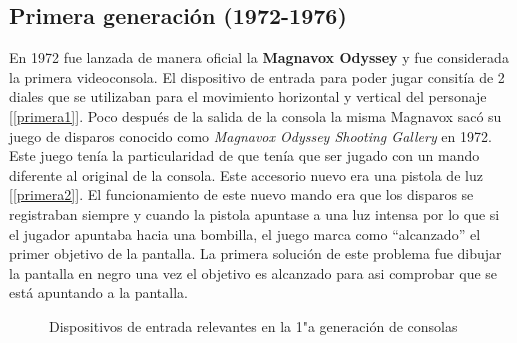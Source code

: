 \subsection{Primera generaci\'on (1972-1976)}

En 1972 fue lanzada de manera oficial la \textbf{Magnavox Odyssey} y fue considerada la primera videoconsola. El dispositivo de entrada para poder jugar consit\'ia de 2 diales que se utilizaban para el movimiento horizontal y vertical del personaje [\ref{primera1}]. Poco despu\'es de la salida de la consola la misma Magnavox sac\'o su juego de disparos conocido como \textit{Magnavox Odyssey Shooting Gallery} en 1972. Este juego ten\'ia la particularidad de que ten\'ia que ser jugado con un mando diferente al original de la consola. Este accesorio nuevo era una pistola de luz [\ref{primera2}]. El funcionamiento de este nuevo mando era que los disparos se registraban siempre y cuando la pistola apuntase a una luz intensa por lo que si el jugador apuntaba hacia una bombilla, el juego marca como ``alcanzado'' el primer objetivo de la pantalla. La primera soluci\'on de este problema fue dibujar la pantalla en negro una vez el objetivo es alcanzado para asi comprobar que se est\'a apuntando a la pantalla. \\

\begin{figure}[!ht]
     \hfill
     \caption{Dispositivos de entrada relevantes en la 1"a  generaci\'on de consolas}
     \label{fig:primera}
   \end{figure}

